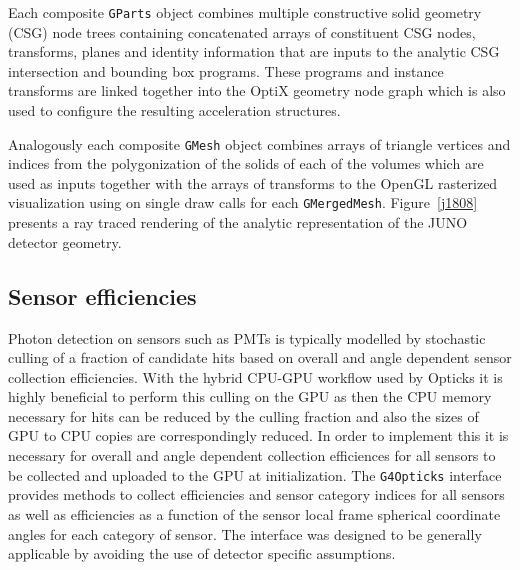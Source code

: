\documentclass{webofc}
\begin{document}
Each composite {\tt GParts} object combines multiple constructive solid geometry (CSG) node trees
containing concatenated arrays of constituent CSG nodes, transforms, planes and identity information
that are inputs to the analytic CSG intersection and bounding box programs. These programs 
and instance transforms are linked together into the OptiX geometry node graph which is also 
used to configure the resulting acceleration structures. 

Analogously each composite {\tt GMesh} object combines arrays of triangle vertices and indices from 
the polygonization of the solids of each of the volumes which are used as inputs together with 
the arrays of transforms to the OpenGL rasterized visualization using on single draw calls for each {\tt GMergedMesh}.
Figure~\ref{j1808} presents a ray traced rendering of the analytic representation of the JUNO detector geometry. 
%
\subsection{Sensor efficiencies}%
%
Photon detection on sensors such as PMTs is typically modelled by stochastic culling of a fraction of 
candidate hits based on overall and angle dependent sensor collection efficiencies. 
With the hybrid CPU-GPU workflow used by Opticks it is highly beneficial to perform this culling 
on the GPU as then the CPU memory necessary for hits can be reduced by the culling fraction and also the sizes of 
GPU to CPU copies are correspondingly reduced. In order to implement this it is necessary for overall and 
angle dependent collection efficiences for all sensors to be collected and uploaded to the GPU at 
initialization. The {\tt G4Opticks} interface provides methods to collect efficiencies and sensor category indices 
for all sensors as well as efficiencies as a function of the sensor local frame spherical coordinate angles 
for each category of sensor. The interface was designed to be generally applicable by avoiding the use of 
detector specific assumptions. 
\end{document}
